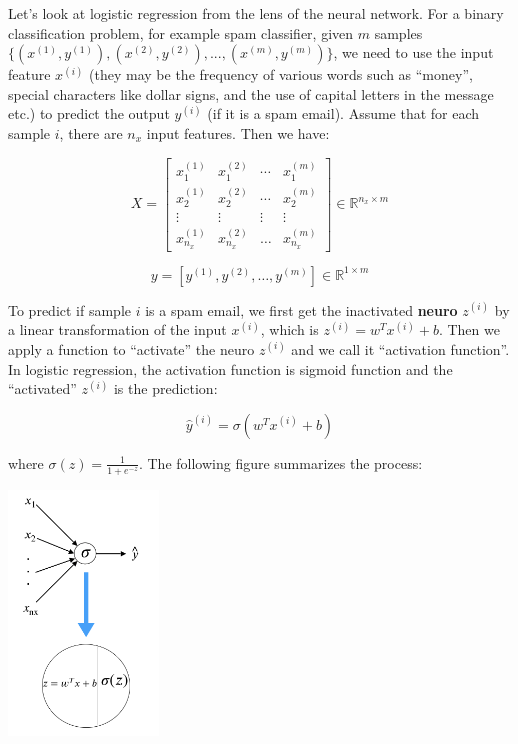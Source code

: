 \documentclass[
  12pt,
]{krantz}
\begin{document}
Let's look at logistic regression from the lens of the neural network. For a binary classification problem, for example spam classifier, given \(m\) samples \(\{(x^{(1)}, y^{(1)}),(x^{(2)}, y^{(2)}),...,(x^{(m)}, y^{(m)})\}\), we need to use the input feature \(x^{(i)}\) (they may be the frequency of various words such as ``money'', special characters like dollar signs, and the use of capital letters in the message etc.) to predict the output \(y^{(i)}\) (if it is a spam email). Assume that for each sample \(i\), there are \(n_{x}\) input features. Then we have:

\begin{equation}
X=\left[\begin{array}{cccc}
x_{1}^{(1)} & x_{1}^{(2)} & \dotsb & x_{1}^{(m)}\\
x_{2}^{(1)} & x_{2}^{(2)} & \dotsb & x_{2}^{(m)}\\
\vdots & \vdots & \vdots & \vdots\\
x_{n_{x}}^{(1)} & x_{n_{x}}^{(2)} & \dots & x_{n_{x}}^{(m)}
\end{array}\right]\in\mathbb{R}^{n_{x}\times m}
\label{eq:input}
\end{equation}

\[y=[y^{(1)},y^{(2)},\dots,y^{(m)}] \in \mathbb{R}^{1 \times m}\]

To predict if sample \(i\) is a spam email, we first get the inactivated \textbf{neuro} \(z^{(i)}\) by a linear transformation of the input \(x^{(i)}\), which is \(z^{(i)}=w^Tx^{(i)} + b\). Then we apply a function to ``activate'' the neuro \(z^{(i)}\) and we call it ``activation function''. In logistic regression, the activation function is sigmoid function and the ``activated'' \(z^{(i)}\) is the prediction:

\[\hat{y}^{(i)} = \sigma(w^Tx^{(i)} + b)\]

where \(\sigma(z) = \frac{1}{1+e^{-z}}\). The following figure summarizes the process:

\includegraphics[width=0.3\textwidth,height=\textheight]{images/dnn0.png}
\end{document}
